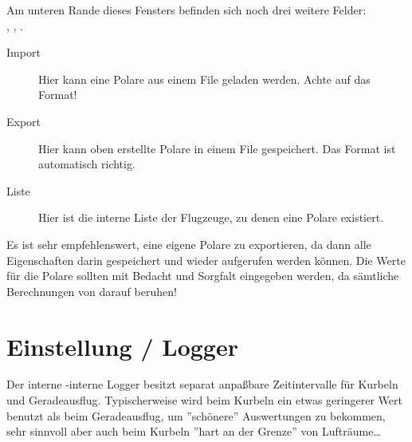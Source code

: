 Am unteren Rande dieses Fensters befinden sich noch drei weitere Felder:\\
,  ,  .
\begin{description}
\item[Import] Hier kann eine Polare aus einem File geladen werden. Achte auf das Format!
\item[Export] Hier kann oben erstellte Polare in einem File gespeichert. Das Format ist automatisch richtig.
\item[Liste] Hier ist die interne Liste der Flugzeuge, zu denen eine Polare existiert.
\end{description}

\tip Es ist sehr empfehlenswert, eine eigene Polare zu exportieren, da dann alle Eigenschaften darin gespeichert und wieder aufgerufen werden können.
Die Werte für  die Polare sollten mit Bedacht und Sorgfalt eingegeben werden, da sämtliche Berechnungen von \xc darauf beruhen!


\section{Einstellung / Logger} \label{conf:logger}

Der interne \xc-interne Logger besitzt separat anpaßbare Zeitintervalle  für Kurbeln  und Geradeausflug.
Typischerweise wird beim Kurbeln ein etwas geringerer Wert benutzt als beim Geradeausflug, um ''schönere'' Auswertungen zu bekommen, sehr sinnvoll aber auch beim Kurbeln ''hart an der Grenze'' von Lufträume\dots

